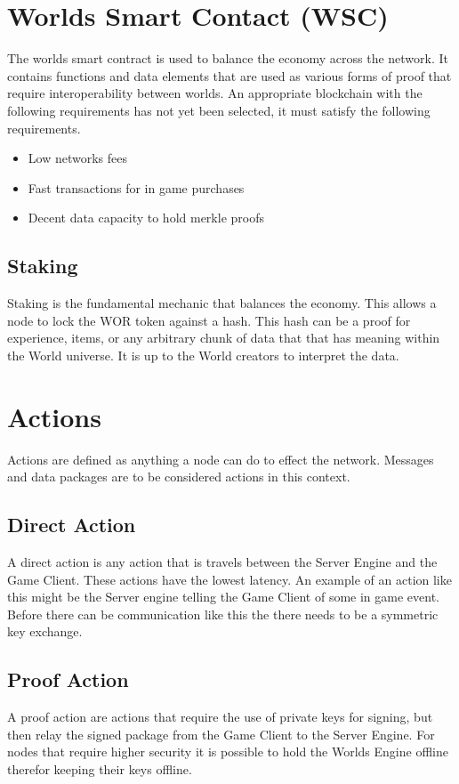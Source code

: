 \documentclass[runningheads,a4paper]{llncs}
\begin{document}
\section{Worlds Smart Contact (WSC)}
\label{WSC}
The worlds smart contract is used to balance the economy across the network. It contains functions and data elements that are used as various forms of proof that require interoperability between worlds. An appropriate blockchain with the following requirements has not yet been selected, it must satisfy the following requirements. 

\begin{itemize}
\item{Low networks fees}
\item{Fast transactions for in game purchases}
\item{Decent data capacity to hold merkle proofs}
\end{itemize}

\subsection{Staking} %
Staking is the fundamental mechanic that balances the economy. This allows a node to lock the WOR token against a hash. This hash can be a proof for experience, items, or any arbitrary chunk of data that that has meaning within the World universe. It is up to the World creators to interpret the data.

\section{Actions}
Actions are defined as anything a node can do to effect the network. Messages and data packages are to be considered actions in this context.

\subsection{Direct Action}
A direct action is any action that is travels between the Server Engine and the Game Client. These actions have the lowest latency. An example of an action like this might be the Server engine telling the Game Client of some in game event. Before there can be communication like this the there needs to be a symmetric key exchange. 

\subsection{Proof Action}
A proof action are actions that require the use of private keys for signing, but then relay the signed package from the Game Client to the Server Engine. For nodes that require higher security it is possible to hold the Worlds Engine offline therefor keeping their keys offline. 
\end{document}
